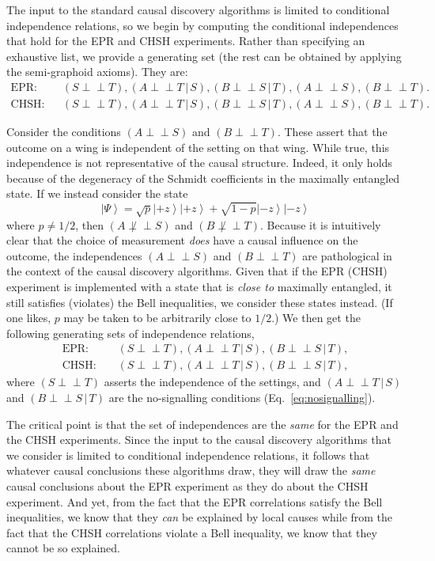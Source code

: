 \documentclass[12pt,onecolumn,nofootinbib]{revtex4-2}
\def\indep{\perp\!\!\!\!\perp}
\begin{document}
The input to the standard causal discovery algorithms is limited to
conditional independence relations, so we begin by computing the conditional
independences that hold for the EPR and CHSH experiments. Rather than
specifying an exhaustive list, we provide a generating set (the rest can be
obtained by applying the semi-graphoid axioms). They are:%
\begin{eqnarray*}
\text{EPR:} 	&&	(S\indep T),	(A\indep T\,|\,S),	(B\indep S\,|\,T),	
				(A\indep S), (B\indep T).				\\
\text{CHSH:}	&&	(S\indep T), 	(A\indep T\,|\,S),	(B\indep S\,|\,T), 
				(A\indep S), (B\indep T).			
\end{eqnarray*}%

Consider the conditions $(A\indep S)$ and $(B\indep T)$.
 These assert that the outcome on a wing is independent of the
setting on that wing. While true, this independence is not representative
of the causal structure. Indeed, it only holds because of the degeneracy
of the Schmidt coefficients in the maximally entangled state. If we instead consider the state
\[
\left\vert \Psi \right\rangle =\sqrt{p}\left\vert +z\right\rangle \left\vert
+z\right\rangle +\sqrt{1-p}\left\vert -z\right\rangle \left\vert
-z\right\rangle
\]
where $p\neq 1/2$, then $(A \not\indep S)$ and $(B \not\indep T)$.
Because it is intuitively clear that the choice of measurement \emph{does} have a causal
influence on the outcome, the independences $(A\indep S)$ and $(B\indep T)$ are pathological in the context
of the causal discovery algorithms. Given that if the EPR (CHSH)
experiment is implemented with a state that is \emph{close to} maximally entangled, it still satisfies
(violates) the Bell inequalities, we consider these states instead.  (If one
likes, $p$ may be taken to be arbitrarily close to $1/2$.)
We then get the following generating sets of independence relations,
\begin{eqnarray*}
\text{EPR: }	&&	\left( S\indep T\right) ,\left( A\indep T\,|\,S\right) ,\left( B\indep S\,|\,T\right), \label{EPRCIrelations}\\
\text{CHSH: }	&&	\left( S\indep T\right) ,\left( A\indep T\,|\,S\right) ,\left( B\indep S\,|\,T\right), \label{CHSHCIrelations}
\end{eqnarray*}%
where $\left( S\indep T\right) $ asserts the independence of the
settings, and $\left( A\indep T\,|\,S\right) $ and $\left( B\indep S\,|\,T\right) $
are the no-signalling conditions (Eq.~\eqref{eq:nosignalling}).  

The critical point is that the set of independences are the \emph{
same }for the EPR and the CHSH experiments. Since the input to the
causal discovery algorithms that we consider is limited to conditional
independence relations, it follows that whatever causal conclusions these
algorithms draw, they will draw the \emph{same} causal conclusions about the
EPR experiment as they do about the CHSH experiment. And yet, from the fact
that the EPR correlations satisfy the Bell inequalities, we know that they
\emph{can }be explained by local causes while from the fact that the CHSH
correlations violate a Bell inequality, we know that they cannot be so
explained.
\end{document}

